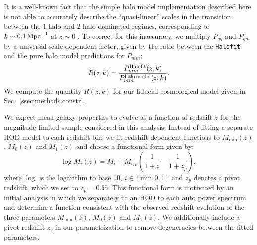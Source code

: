 \documentclass[a4paper,11pt]{article}
\begin{document}
    It is a well-known fact that the simple halo model implementation described here is not able to accurately describe the ``quasi-linear'' scales in the transition between the 1-halo and 2-halo-dominated regimes, corresponding to $k\sim0.1\,{\rm Mpc}^{-1}$ at $z\sim0$ \citep{2015MNRAS.454.1958M}. To correct for this inaccuracy, we multiply $P_{gg}$ and $P_{gm}$ by a universal scale-dependent factor, given by the ratio between the {\tt Halofit} and the pure halo model predictions for $P_{mm}$:
    \begin{equation}
      R(z,k)=\frac{P^{\rm Halofit}_{mm}(z,k)}{P^{\rm halo\,model}_{mm}(z,k)}.
    \end{equation}
We compute the quantity $R(z,k)$ for our fiducial cosmological model given in Sec.~\ref{ssec:methods.constr}.
 
    We expect mean galaxy properties to evolve as a function of redshift $z$ for the magnitude-limited sample considered in this analysis. Instead of fitting a separate HOD model to each redshift bin, we fit redshift-dependent functions to $M_{\mathrm{min}}(z)$, $M_{0}(z)$ and $M_{1}(z)$ and choose a functional form given by:
    \begin{equation}
      \log{M_{i}(z)} = M_{i} + M_{i, p} \left(\frac{1}{1+z} - \frac{1}{1+z_{p}}\right),
    \end{equation}
    where $\log$ is the logarithm to base 10, $i \in [\mathrm{min}, 0, 1]$ and $z_{p}$ denotes a pivot redshift, which we set to $z_{p} = 0.65$. This functional form is motivated by an initial analysis in which we separately fit an HOD to each auto power spectrum and determine a function consistent with the observed redshift evolution of the three parameters $M_{\mathrm{min}}(z)$, $M_{0}(z)$ and $M_{1}(z)$. We additionally include a pivot redshift $z_{p}$ in our parametrization to remove degeneracies between the fitted parameters.
\end{document}
